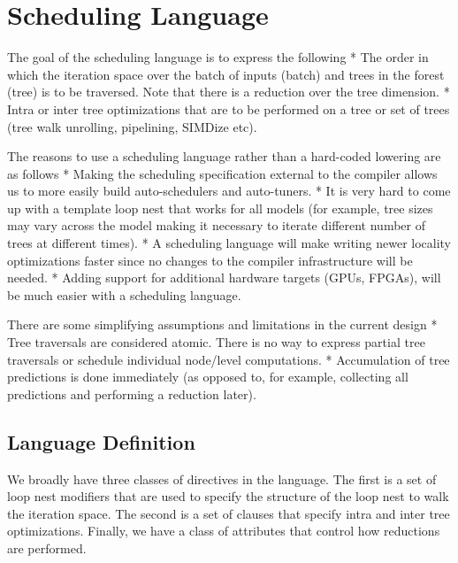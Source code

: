 \section{Scheduling Language}
The goal of the scheduling language is to express the following
* The order in which the iteration space over the batch of inputs (batch) and trees in the forest (tree) is to be traversed. Note that there is a reduction over the tree dimension.
* Intra or inter tree optimizations that are to be performed on a tree or set of trees (tree walk unrolling, pipelining, SIMDize etc).

The reasons to use a scheduling language rather than a hard-coded lowering are as follows
* Making the scheduling specification external to the compiler allows us to 
more easily build auto-schedulers and auto-tuners.
* It is very hard to come up with a template loop nest that works for all models (for example, tree sizes may vary across the model making it necessary to iterate different number of trees at different times). 
* A scheduling language will make writing newer locality optimizations faster since no changes to the compiler infrastructure will be needed.
* Adding support for additional hardware targets (GPUs, FPGAs), will be much easier with a scheduling language.

There are some simplifying assumptions and limitations in the current design
* Tree traversals are considered atomic. There is no way to express partial tree traversals or schedule individual node/level computations. 
* Accumulation of tree predictions is done immediately (as opposed to, for example, collecting all predictions and performing a reduction later).

\subsection{Language Definition}
We broadly have three classes of directives in the language. The first is a set of loop nest modifiers that are used to specify the structure of the loop nest to walk the iteration space. The second is a set of clauses that specify intra and inter tree optimizations. Finally, we have a class of attributes that control how reductions are performed.


